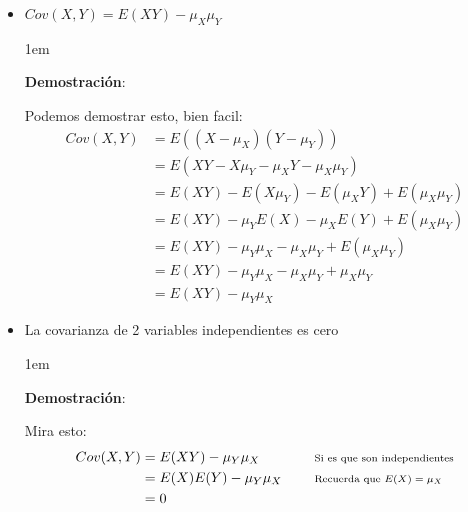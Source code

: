 \documentclass[12pt, fleqn]{report}                             %
\newenvironment{SmallIndentation}[1][0.75em]                    %
        {\begin{adjustwidth}{#1}{}\begin{footnotesize}}             %
        {\end{footnotesize}\end{adjustwidth}}                       %
\DeclareMathOperator \Space {\quad}                             %
\newcommand \Remember[1]{\Space\text{\scriptsize{#1}}}          %
\theoremstyle{break}                                            %
\newcommand{\Wrap}[1]{\left( #1 \right)}                        %
\begin{document}
                \begin{itemize}

                    \item 
                        $Cov(X, Y) = E(X Y) - \mu_{X}\mu_{Y}$

                        \begin{SmallIndentation}[1em]
                            \textbf{Demostración}:
                            
                            Podemos demostrar esto, bien facil:
                            \begin{align*}
                                Cov(X, Y)
                                    &= E\Wrap{(X - \mu_X)(Y - \mu_Y)}                   \\
                                    &= E\Wrap{XY - X\mu_Y -\mu_XY - \mu_X\mu_Y}         \\
                                    &= E(XY) - E(X\mu_Y) -E(\mu_XY) + E(\mu_X\mu_Y)     \\
                                    &= E(XY) - \mu_YE(X) -\mu_XE(Y) +  E(\mu_X\mu_Y)    \\
                                    &= E(XY) - \mu_Y\mu_X -\mu_X\mu_Y + E(\mu_X\mu_Y)   \\
                                    &= E(XY) - \mu_Y\mu_X -\mu_X\mu_Y + \mu_X\mu_Y      \\
                                    &= E(XY) - \mu_Y\mu_X
                            \end{align*}
                        
                        \end{SmallIndentation}

                    \item La covarianza de 2 variables independientes es cero

                    \begin{SmallIndentation}[1em]
                        \textbf{Demostración}:
                        
                        Mira esto:
                        \begin{align*}
                            Cov(X, Y)
                                &= E(XY) - \mu_Y\mu_X                           
                                    && \Remember{Si es que son independientes}      \\
                                &= E(X)E(Y) - \mu_Y\mu_X
                                    && \Remember{Recuerda que $E(X) = \mu_X$}       \\
                                &= 0
                        \end{align*}
                    
                    \end{SmallIndentation}
                        
                            
                \end{itemize}
\end{document}
